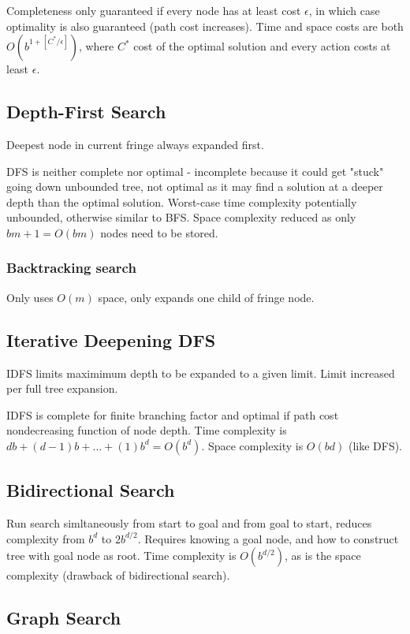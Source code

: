 \begin{multicols}{4}
Completeness only guaranteed if every node has at least cost $\epsilon$, in which case optimality is also guaranteed (path cost increases). Time and space costs are both $O(b^{1+[C^*/\epsilon]})$, where $C^*$ cost of the optimal solution and every action costs at least $\epsilon$.

\subsection{Depth-First Search}

Deepest node in current fringe always expanded first.

DFS is neither complete nor optimal - incomplete because it could get "stuck" going down unbounded tree, not optimal as it may find a solution at a deeper depth than the optimal solution. Worst-case time complexity potentially unbounded, otherwise similar to BFS.
Space complexity reduced as only $bm + 1 = O(bm)$ nodes need to be stored.

\subsubsection{Backtracking search}

Only uses $O(m)$ space, only expands one child of fringe node.

\subsection{Iterative Deepening DFS}

IDFS limits maximimum depth to be expanded to a given limit. Limit increased per full tree expansion.

IDFS is complete for finite branching factor and optimal if path cost nondecreasing function of node depth. Time complexity is $db + (d-1)b + \dots + (1)b^d = O(b^d)$. Space complexity is $O(bd)$ (like DFS).

\subsection{Bidirectional Search}

Run search simltaneously from start to goal and from goal to start, reduces complexity from $b^d$ to $2b^{d/2}$. Requires knowing a goal node, and how to construct tree with goal node as root. Time complexity is $O(b^{d/2})$, as is the space complexity (drawback of bidirectional search).

\subsection{Graph Search}


\end{multicols}
